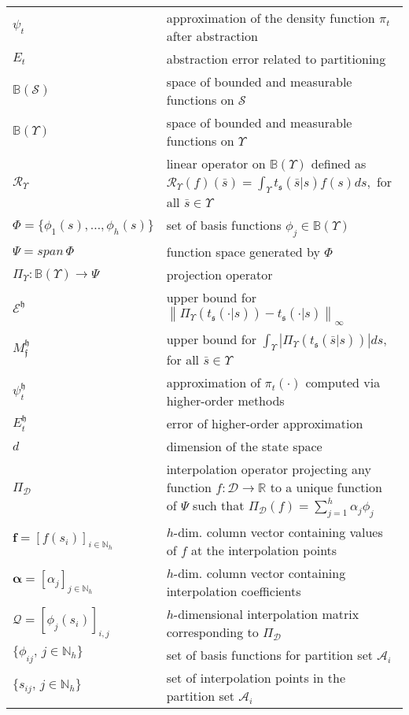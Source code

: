 \documentclass{LMCS}
\begin{document}
\begin{longtable}{lp{10.5cm}}
$\psi_t$ & approximation of the density function $\pi_t$ after abstraction\\
$E_t$ & abstraction error related to partitioning\\
$\mathbb B(\mathcal S)$ &  space of bounded and measurable functions on $\mathcal S$\\
$\mathbb B(\Upsilon)$ & space of bounded and measurable functions on $\Upsilon$\\
$\mathcal R_\Upsilon$ & linear operator on $\mathbb B(\Upsilon)$ defined as  $\mathcal R_\Upsilon (f)(\bar s) = \int_{\Upsilon}t_{\mathfrak s}(\bar s|s)f(s)ds,$ for all $\bar s\in\Upsilon$\\
$\Phi = \{\phi_1(s),\ldots,\phi_h(s)\}$ & set of basis functions $\phi_j\in\mathbb B(\Upsilon)$\\
$\Psi = span\,\Phi$ & function space generated by $\Phi$\\
$\Pi_{\Upsilon}:\mathbb B(\Upsilon)\rightarrow \Psi$ & projection operator\\
$\mathcal E^{\mathfrak h}$&  upper bound for $\left\| \Pi_{\Upsilon}(t_{\mathfrak s}(\cdot|s)) - t_{\mathfrak s}(\cdot|s)\right\|_\infty$\\
$M_{\mathfrak f}^{\mathfrak h}$&  upper bound for $\int_{\Upsilon}\left|\Pi_{\Upsilon}(t_{\mathfrak s}(\bar s|s))\right| ds$, for all $\bar s\in\Upsilon$\\
$\psi_t^{\mathfrak h}$ & approximation of $\pi_t(\cdot)$ computed via higher-order methods\\
$E_t^{\mathfrak h}$ & error of higher-order approximation\\
$d$ & dimension of the state space\\
$\Pi_{\mathcal D}$ & interpolation operator 
projecting any function $f:\mathcal D\rightarrow \mathbb R$
to a unique function of $\Psi$ such that $\Pi_{\mathcal D}(f) = \sum_{j=1}^{h}\alpha_j\phi_j$\\
$\mathbf f = [f(s_i)]_{i \in\mathbb N_h}$ & $h$-dim. column vector containing values of $f$ at the interpolation points\\
$\boldsymbol{\alpha} = [\alpha_j]_{j \in\mathbb N_h}$ & $h$-dim. column vector containing interpolation coefficients\\
$\mathcal Q = [\phi_j(s_i)]_{i,j}$ & $h$-dimensional interpolation matrix corresponding to $\Pi_{\mathcal D}$\\
$\{\phi_{ij},\,j\in\mathbb N_h\}$ & set of basis functions for partition set $\mathcal A_i$\\
$\{s_{ij},\,j\in\mathbb N_h\}$ & set of interpolation points in the partition set $\mathcal A_i$\\

\end{longtable}
\end{document}
